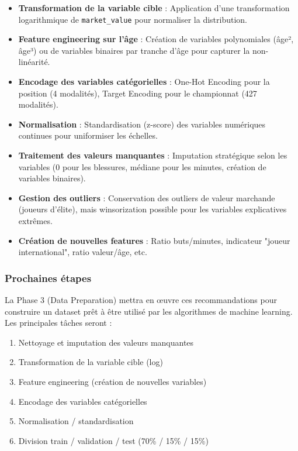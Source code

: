\documentclass[12pt,a4paper]{article}
\begin{document}
\begin{itemize}[leftmargin=*]
    \item \textbf{Transformation de la variable cible} : Application d'une transformation logarithmique de \texttt{market\_value} pour normaliser la distribution.
    
    \item \textbf{Feature engineering sur l'âge} : Création de variables polynomiales (âge², âge³) ou de variables binaires par tranche d'âge pour capturer la non-linéarité.
    
    \item \textbf{Encodage des variables catégorielles} : One-Hot Encoding pour la position (4 modalités), Target Encoding pour le championnat (427 modalités).
    
    \item \textbf{Normalisation} : Standardisation (z-score) des variables numériques continues pour uniformiser les échelles.
    
    \item \textbf{Traitement des valeurs manquantes} : Imputation stratégique selon les variables (0 pour les blessures, médiane pour les minutes, création de variables binaires).
    
    \item \textbf{Gestion des outliers} : Conservation des outliers de valeur marchande (joueurs d'élite), mais winsorization possible pour les variables explicatives extrêmes.
    
    \item \textbf{Création de nouvelles features} : Ratio buts/minutes, indicateur "joueur international", ratio valeur/âge, etc.
\end{itemize}

\subsubsection{Prochaines étapes}

La Phase 3 (Data Preparation) mettra en œuvre ces recommandations pour construire un dataset prêt à être utilisé par les algorithmes de machine learning. Les principales tâches seront :

\begin{enumerate}[leftmargin=*]
    \item Nettoyage et imputation des valeurs manquantes
    \item Transformation de la variable cible (log)
    \item Feature engineering (création de nouvelles variables)
    \item Encodage des variables catégorielles
    \item Normalisation / standardisation
    \item Division train / validation / test (70\% / 15\% / 15\%)
\end{enumerate}
\end{document}
